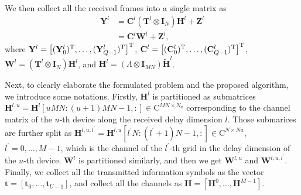 \documentclass[conference]{IEEEtran}
\begin{document}
	We then collect all the received frames into a single matrix as 
	\begin{align}
		\label{allframe}
		\mathbf Y^l &=  \mathbf C^l (\mathbf T^l \otimes \mathbf I_N ) \mathbf H^l + \mathbf Z^l \\ 
		&= \mathbf C^l \mathbf W^l + \mathbf Z^l, \label{wr}
	\end{align}
	where $\mathbf Y^l = \left[(\mathbf Y_0^l)^{\text T},\dots,(\mathbf Y_{Q-1}^l)^{\text T}\right]^{\text T}$,  $\mathbf C^l = \left[(\mathbf C_0^l)^{\text T},\dots,(\mathbf C_{Q-1}^l)^{\text T}\right]^{\text T}$, $\mathbf W^l = (\mathbf T^l \otimes \mathbf I_N ) \mathbf H^l$, and $\mathbf H^l = (\Lambda \otimes \mathbf{I}_{MN})  \tilde{\mathbf H}^l$. 
	
	Next, to clearly elaborate the formulated problem and the proposed algorithm, we introduce some notations. Firstly, $\mathbf H^l$ is partitioned as submatrices $\mathbf H^{l,u}=\mathbf H^l[uMN:(u+1)MN-1,:] \in \mathrm{C}^{MN \times N_a}$ corresponding to the channel matrix of the $u$-th device along the received delay dimension $l$. Those submarices are further split as $\mathbf H^{l,u,l^{\prime}} = \mathbf H^{l,u}[l^{\prime}N:(l^{\prime}+1)N-1,:] \in \mathrm{C}^{N \times Na}$, $l^{\prime}=0,\dots,M-1$, which is the channel of the $l^{\prime}$-th grid in the delay dimension of the $u$-th device. $\mathbf W^l$ is partitioned similarly, and then we get $\mathbf W^{l,u}$ and $\mathbf W^{l,u,l^{\prime}}$.  Finally, we collect all the transmitted information symbols as the vector $\mathbf t = [\mathbf t_0,\dots,\mathbf t_{U-1}]$, and collect all the channels as $\mathbf H = [\mathbf H^0,\dots,\mathbf H^{M-1}]$. 
	
\end{document}
